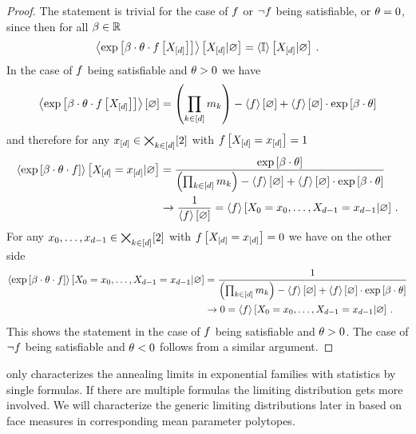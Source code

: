 \begin{proof}
	The statement is trivial for the case of $f$ or $\lnot f$ being satisfiable, or $\theta=0$, since then for all $\beta\in\mathbb{R}$
	\begin{align*}
		\left\langle \mathrm{exp}\left[\beta\cdot\theta\cdot f\left[X_{[d]}\right]\right]\right\rangle \left[ X_{[d]} | \varnothing \right] = \left\langle \mathbb{I}\right\rangle \left[ X_{[d]} | \varnothing \right] \, .
	\end{align*}
	In the case of $f$ being satisfiable and $\theta>0$ we have
	\begin{align*}
		\left\langle \mathrm{exp}\left[\beta\cdot\theta\cdot f\left[X_{[d]}\right]\right]\right\rangle \left[ \varnothing \right]
		= \left(\prod_{k\in[d]} m_{k}\right) - \left\langle f\right\rangle \left[ \varnothing \right] + \left\langle f\right\rangle \left[ \varnothing \right] \cdot \mathrm{exp}\left[\beta\cdot\theta\right]
	\end{align*}
	and therefore for any $x_{[d]}\in\bigtimes_{k\in[d]}[2]$ with $f\left[X_{[d]}=x_{[d]}\right]=1$
	\begin{align*}
		\left\langle \mathrm{exp}\left[\beta\cdot\theta\cdot f\right]\right\rangle \left[ X_{[d]}=x_{[d]} | \varnothing \right]
		&= \frac{
			\mathrm{exp}\left[\beta\cdot\theta\right]
			}{
			\left(\prod_{k\in[d]} m_{k} \right) - \left\langle f\right\rangle \left[ \varnothing \right] + \left\langle f\right\rangle \left[ \varnothing \right] \cdot \mathrm{exp}\left[\beta\cdot\theta\right]
			} \\
		& \rightarrow \frac{1}{\left\langle f\right\rangle \left[ \varnothing \right]}
		= \left\langle f\right\rangle \left[ X_{0}=x_{0},\ldots,X_{d-1}=x_{d-1} | \varnothing \right] \, .
	\end{align*}
	For any ${x_{0},\ldots,x_{d-1}}\in\bigtimes_{k\in[d]}[2]$ with $f\left[X_{[d]}=x_{[d]}\right]=0$ we have on the other side
	\begin{align*}
		\left\langle \mathrm{exp}\left[\beta\cdot\theta\cdot f\right]\right\rangle \left[ X_{0}=x_{0},\ldots,X_{d-1}=x_{d-1} | \varnothing \right]
		&= \frac{
			1
			}{
			\left(\prod_{k\in[d]} m_{k}\right) - \left\langle f\right\rangle \left[ \varnothing \right] + \left\langle f\right\rangle \left[ \varnothing \right] \cdot \mathrm{exp}\left[\beta\cdot\theta\right]
			} \\
		& \rightarrow 0
		= \left\langle f\right\rangle \left[ X_{0}=x_{0},\ldots,X_{d-1}=x_{d-1} | \varnothing \right] \, .
	\end{align*}
	This shows the statement in the case of $f$ being satisfiable and $\theta>0$.
	The case of $\lnot f$ being satisfiable and $\theta<0$ follows from a similar argument.
\end{proof}

 only characterizes the annealing limits in exponential families with statistics by single formulas.
If there are multiple formulas the limiting distribution gets more involved.
We will characterize the generic limiting distributions later in  based on face measures in corresponding mean parameter polytopes.

